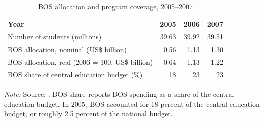 \begin{table}[H]
\caption{BOS allocation and program coverage, 2005--2007}
\label{tab:bos_allocation}
\centering
\begin{threeparttable}
\begin{tabular}[t]{lrrr}
\toprule
Year & 2005 & 2006 & 2007 \\
\midrule
Number of students (millions) & 39.63 & 39.92 & 39.51 \\
BOS allocation, nominal (US\$ billion) & 0.56 & 1.13 & 1.30 \\
BOS allocation, real (2006 = 100, US\$ billion) & 0.64 & 1.13 & 1.22 \\
BOS share of central education budget (\%) & 18 & 23 & 23 \\
\bottomrule
\end{tabular}
\begin{tablenotes}[para]
\item \textit{Note:} Source: \citet{WorldBank2008}. BOS share reports BOS spending as a share of the central education budget. In 2005, BOS accounted for 18 percent of the central education budget, or roughly 2.5 percent of the national budget.
\end{tablenotes}
\end{threeparttable}
\end{table}
